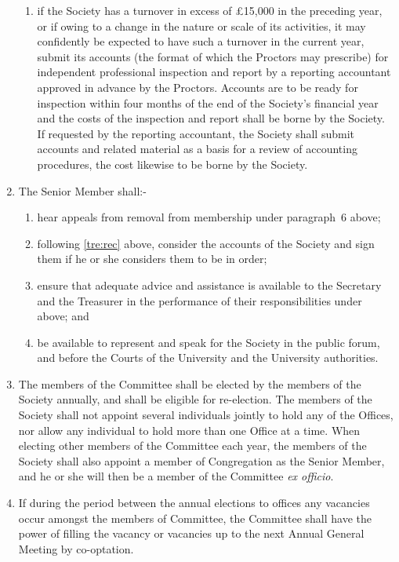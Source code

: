 \documentclass[11pt]{article}
\begin{document}
\begin{enumerate}
\begin{enumerate}
\item if the Society has a turnover in excess of \pounds 15,000 in the preceding year, or if owing to a change in the nature or scale of its activities, it may confidently be expected to have such a turnover in the current year, submit its accounts (the format of which the Proctors may prescribe) for independent professional inspection and report by a reporting accountant approved in advance by the Proctors. Accounts are to be ready for inspection within four months of the end of the Society's financial year and the costs of the inspection and report shall be borne by the Society. If requested by the reporting accountant, the Society shall submit accounts and related material as a basis for a review of accounting procedures, the cost likewise to be borne by the Society.
\end{enumerate}
\item The Senior Member shall:-
\begin{enumerate}
\item hear appeals from removal from membership under paragraph~6 above;
\item following \cref{tre:rec} above, consider the accounts of the Society and sign them if he or she considers them to be in order;
\item ensure that adequate advice and assistance is available to the Secretary and the Treasurer in the performance of their responsibilities under  above; and
\item be available to represent and speak for the Society in the public forum, and before the Courts of the University and the University authorities.
\end{enumerate}
\item The members of the Committee shall be elected by the members of the Society annually, and shall be eligible for re-election. The members of the Society shall not appoint several individuals jointly to hold any of the Offices, nor allow any individual to hold more than one Office at a time. When electing other members of the Committee each year, the members of the Society shall also appoint a member of Congregation as the Senior Member, and he or she will then be a member of the Committee \emph{ex officio}.
\item If during the period between the annual elections to offices any vacancies occur amongst the members of Committee, the Committee shall have the power of filling the vacancy or vacancies up to the next Annual General Meeting by co-optation.

\end{enumerate}
\end{document}
